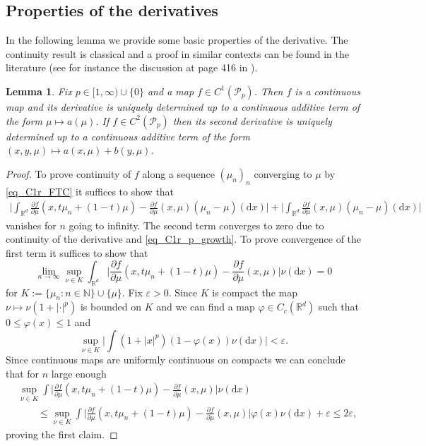 \documentclass{article}
\newtheorem{lemma}[theorem]{Lemma}
\theoremstyle{definition}
\numberwithin{equation}{section}
\numberwithin{theorem}{section}
\newcommand{\R}{\mathbb{R}}
\newcommand{\dx}{\mathrm{d}x}
\newcommand{\e}{\varepsilon}
\newcommand{\N}{{\mathbb N}}
\newcommand{\Pcal}{{\mathcal P}}
\begin{document}
\begin{appendix}
	\section{Properties of the derivatives}\label{secC}
	In the following lemma we provide some basic properties of the derivative. The continuity result is classical and a proof in similar contexts can be found in the literature (see for instance the discussion at page 416 in \cite{car_del_18_I}). 
	\begin{lemma}
Fix $p \in [1,\infty) \cup \{0\}$ and a map $f\in C^1(\Pcal_p)$. Then $f$ is a continuous map and its derivative is uniquely determined up to a continuous additive term of the form $\mu\mapsto a(\mu)$. If $f\in C^2(\Pcal_p)$ then its second derivative is  uniquely determined up to a continuous additive term of the form $(x,y,\mu)\mapsto a(x,\mu)+b(y,\mu)$. 
	\end{lemma}
	\begin{proof}
	  To prove continuity of $f$ along a sequence $(\mu_n)_n$ converging to $ \mu$ by \eqref{eq_C1r_FTC} it suffices to show that 
  \begin{align*}
  \bigg| \int_{\R^d} \frac{\partial f}{\partial\mu}(x,t\mu_n + (1-t)\mu)-\frac{\partial f}{\partial\mu}(x,\mu)(\mu_n-\mu)(\dx)\bigg|
  + \bigg| \int_{\R^d}\frac{\partial f}{\partial\mu}(x,\mu)(\mu_n-\mu)(\dx)\bigg|
  \end{align*}
  vanishes for $n$ going to infinity.
  The second term converges to zero due to continuity of the derivative and \eqref{eq_C1r_p_growth}. To prove convergence of the first term it suffices to show that
  $$\lim_{n\to\infty}\sup_{\nu\in K}\int_{\R^d}\bigg| \frac{\partial f}{\partial\mu}(x,t\mu_n + (1-t)\mu)-\frac{\partial f}{\partial\mu}(x,\mu)\bigg|\nu(\dx)=0$$
  for $K:=\{\mu_n\colon n\in \N\}\cup\{\mu\}$. Fix $\e>0$. Since $K$ is compact the map $\nu\mapsto\nu(1+|\cdot|^p)$ is bounded on $K$ and we can find a map   $\varphi\in C_c(\R^d)$ such that $0\leq\varphi(x)\leq 1$ and 
  $$\sup_{\nu\in K}\bigg|\int(1+|x|^p)(1-\varphi(x))\nu(\dx)\bigg|<\e.$$
  Since continuous maps are uniformly continuous on compacts we can conclude that for $n$ large enough
\begin{align*}
    &\sup_{\nu\in K}\int \bigg| \frac{\partial f}{\partial\mu}(x,t\mu_n + (1-t)\mu)-\frac{\partial f}{\partial\mu}(x,\mu)\bigg| \nu(\dx)\\
  &\qquad\leq \sup_{\nu\in K}\int \bigg| \frac{\partial f}{\partial\mu}(x,t\mu_n + (1-t)\mu)-\frac{\partial f}{\partial\mu}(x,\mu)\bigg| \varphi(x)\nu(\dx)+\e
  \leq 2\e,
\end{align*}
  proving the first claim.
	

\end{proof}
\end{appendix}
\end{document}
